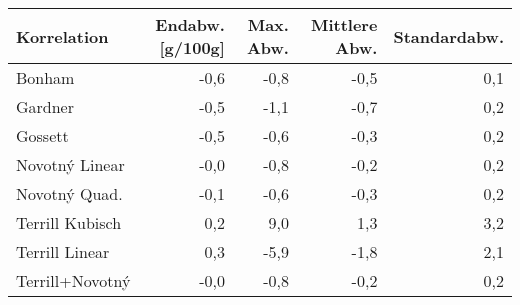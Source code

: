 \begin{tabular}{lrrrr}
\toprule
    Korrelation &  Endabw. [g/100g] &  Max. Abw. &  Mittlere Abw. &  Standardabw. \\
\midrule
         Bonham &              -0,6 &       -0,8 &           -0,5 &           0,1 \\
        Gardner &              -0,5 &       -1,1 &           -0,7 &           0,2 \\
        Gossett &              -0,5 &       -0,6 &           -0,3 &           0,2 \\
 Novotný Linear &              -0,0 &       -0,8 &           -0,2 &           0,2 \\
  Novotný Quad. &              -0,1 &       -0,6 &           -0,3 &           0,2 \\
Terrill Kubisch &               0,2 &        9,0 &            1,3 &           3,2 \\
 Terrill Linear &               0,3 &       -5,9 &           -1,8 &           2,1 \\
Terrill+Novotný &              -0,0 &       -0,8 &           -0,2 &           0,2 \\
\bottomrule
\end{tabular}
